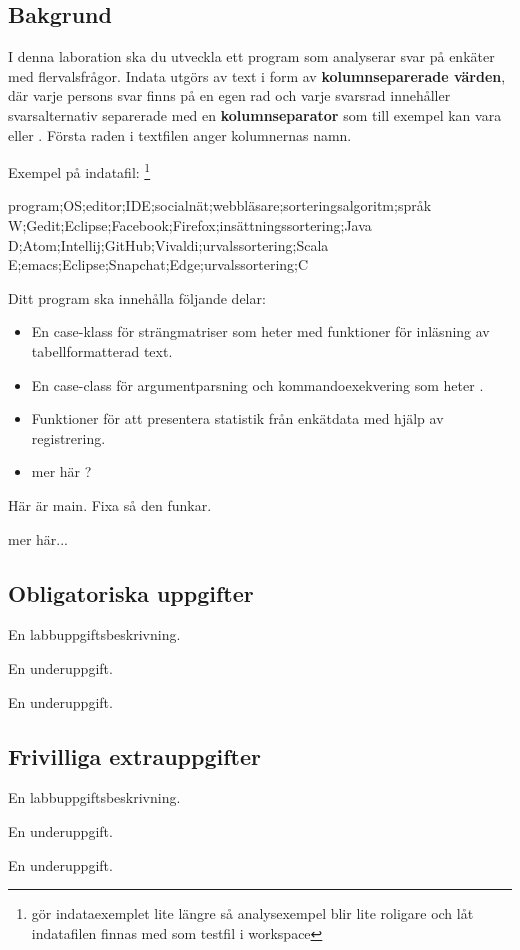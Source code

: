 \subsection{Bakgrund}

I denna laboration ska du utveckla ett program som analyserar svar på enkäter med flervalsfrågor. Indata utgörs av text i form av \textbf{kolumnseparerade värden}, där varje persons svar finns på en egen rad och varje svarsrad innehåller svarsalternativ separerade med en \textbf{kolumnseparator} som till exempel kan vara \code{;} eller \code{\t}. Första raden i textfilen anger kolumnernas namn.

Exempel på indatafil: \footnote{\TODO gör indataexemplet lite längre så analysexempel blir lite roligare och låt indatafilen finnas med som testfil i workspace}
\begin{CodeSmall}[language=, ]
program;OS;editor;IDE;socialnät;webbläsare;sorteringsalgoritm;språk
W;Gedit;Eclipse;Facebook;Firefox;insättningssortering;Java
D;Atom;Intellij;GitHub;Vivaldi;urvalssortering;Scala
E;emacs;Eclipse;Snapchat;Edge;urvalssortering;C
\end{CodeSmall}

Ditt program ska innehålla följande delar:
\begin{itemize}
\item En case-klass för strängmatriser som heter  med funktioner för inläsning av tabellformatterad text.
\item En case-class för argumentparsning och kommandoexekvering som heter . 
\item Funktioner för att presentera statistik från enkätdata med hjälp av registrering.
\item \TODO mer här ?
\end{itemize}

Här är main. Fixa så den funkar.



\TODO mer här...



\subsection{Obligatoriska uppgifter}

\Task En labbuppgiftsbeskrivning.

\Subtask En underuppgift.

\Subtask En underuppgift.

\subsection{Frivilliga extrauppgifter}
    
\Task En labbuppgiftsbeskrivning.

\Subtask En underuppgift.

\Subtask En underuppgift.


